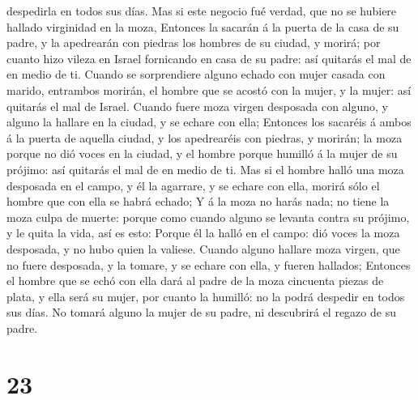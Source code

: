 despedirla en todos sus días.  Mas si este negocio fué
verdad, que no se hubiere hallado virginidad en la moza, 
Entonces la sacarán á la puerta de la casa de su padre, y la apedrearán
con piedras los hombres de su ciudad, y morirá; por cuanto hizo vileza
en Israel fornicando en casa de su padre: así quitarás el mal de en
medio de ti.  Cuando se sorprendiere alguno echado con
mujer casada con marido, entrambos morirán, el hombre que se acostó con
la mujer, y la mujer: así quitarás el mal de Israel. 
Cuando fuere moza virgen desposada con alguno, y alguno la hallare en la
ciudad, y se echare con ella;  Entonces los sacaréis á
ambos á la puerta de aquella ciudad, y los apedrearéis con piedras, y
morirán; la moza porque no dió voces en la ciudad, y el hombre porque
humilló á la mujer de su prójimo: así quitarás el mal de en medio de ti.
 Mas si el hombre halló una moza desposada en el campo, y
él la agarrare, y se echare con ella, morirá sólo el hombre que con ella
se habrá echado;  Y á la moza no harás nada; no tiene la
moza culpa de muerte: porque como cuando alguno se levanta contra su
prójimo, y le quita la vida, así es esto:  Porque él la
halló en el campo: dió voces la moza desposada, y no hubo quien la
valiese.  Cuando alguno hallare moza virgen, que no fuere
desposada, y la tomare, y se echare con ella, y fueren hallados;
 Entonces el hombre que se echó con ella dará al padre de
la moza cincuenta piezas de plata, y ella será su mujer, por cuanto la
humilló: no la podrá despedir en todos sus días.  No
tomará alguno la mujer de su padre, ni descubrirá el regazo de su padre.

\hypertarget{section-22}{%
\section{23}\label{section-22}}

